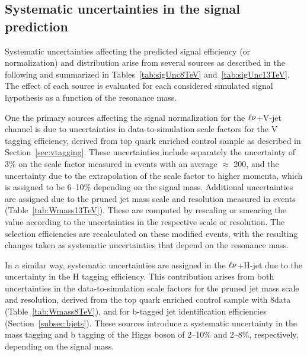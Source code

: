 \subsection{Systematic uncertainties in the signal prediction}\label{subsec:uncSig}

Systematic uncertainties affecting the predicted signal efficiency (or normalization) and \mlvj distribution arise from several sources as described in the following and summarized in Tables~\ref{tab:sigUnc8TeV} and~\ref{tab:sigUnc13TeV}.
The effect of each source is evaluated for each considered simulated signal hypothesis as a function of the resonance mass.

One the primary sources affecting the signal normalization for the $\ell\nu$+V-jet channel is due to uncertainties in data-to-simulation scale factors for the V tagging efficiency, derived from top quark enriched control sample as described in Section~\ref{sec:vtagging}. These uncertainties include separately the uncertainty of 3\% on the scale factor measured in \ttbar events with an average \pt $\approx$ 200\GeV, and the uncertainty due to the extrapolation of the scale factor to higher momenta, which is assigned to be 6--10\% depending on the signal mass. Additional uncertainties are assigned due to the pruned jet mass scale and resolution measured in \ttbar events (Table~\ref{tab:Wmass13TeV}). These are computed by rescaling or smearing the \mJ value according to the uncertainties in the respective \mJ scale or resolution. The selection efficiencies are recalculated on these modified events, with the resulting changes taken as systematic uncertainties that depend on the resonance mass.

In a similar way, systematic uncertainties are assigned in the $\ell\nu$+H-jet due to the uncertainty in the H tagging efficiency. This contribution arises from both uncertainties in the data-to-simulation scale factors for the pruned jet mass scale and resolution, derived from the top quark enriched control sample with 8\TeV data (Table~\ref{tab:Wmass8TeV}), and for b-tagged jet identification efficiencies (Section~\ref{subsec:bjets}). These sources introduce a systematic uncertainty in the mass tagging and b tagging of the Higgs boson of 2--10\% and 2--8\%, respectively, depending on the signal mass.

